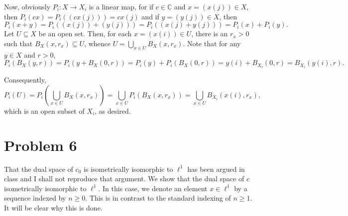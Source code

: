 \documentclass[10pt]{amsart}
\theoremstyle{thmstyle}
\theoremstyle{defstyle}
\newcommand{\bbC}{\mathbb{C}}
\renewcommand{\ge}{\geqslant}
\begin{document}
\begin{enumerate}[label=(\alph*)]
	Now, obviously $P_i: X\to X_i$ is a linear map, for if $c\in\bbC$ and $x = (x(j))\in X$, then $P_i\left(cx\right) = P_i\left((cx(j))\right) = cx(j)$ and if $y = (y(j))\in X$, then 
	\begin{equation*}
		P_i(x + y) = P_i\left((x(j)) + (y(j))\right) = P_i\left((x(j) + y(j))\right) = P_i(x) + P_i(y).
	\end{equation*}
	Let $U\subseteq X$ be an open set. Then, for each $x = (x(i))\in U$, there is an $r_x > 0$ such that $B_X(x, r_x)\subseteq U$, whence $U = \bigcup_{x\in U} B_X(x, r_x)$. Note that for any $y\in X$ and $r > 0$,
	\begin{equation*}
		P_i\left(B_X(y, r)\right) = P_i\left(y + B_X(0, r)\right) = P_i(y) + P_i\left(B_X(0,r)\right) = y(i) + B_{X_i}(0, r) = B_{X_i}(y(i), r).
	\end{equation*}
	
	Consequently, 
	\begin{equation*}
		P_i(U) = P_i\left(\bigcup_{x\in U} B_X(x, r_x)\right) = \bigcup_{x\in U} P_i\left(B_X(x, r_x)\right) = \bigcup_{x\in U} B_{X_i}(x(i), r_x),
	\end{equation*}
	which is an open subset of $X_i$, as desired.
\end{enumerate}

\section{Problem 6}

That the dual space of $c_0$ is isometrically isomorphic to $\ell^1$ has been argued in class and I shall not reproduce that argument.
We show that the dual space of $c$ isometrically isomorphic to $\ell^1$. In this case, we denote an element $x\in\ell^1$ by a sequence indexed by $n\ge 0$. This is in contrast to the standard indexing of $n\ge 1$. It will be clear why this is done.
\end{document}
